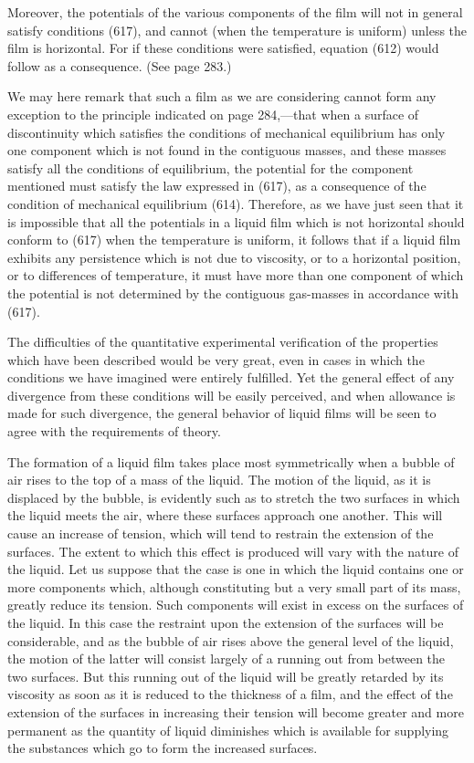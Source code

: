 \documentclass[12pt]{article}
\begin{document}
Moreover, the potentials of the various components of the film will not in general satisfy conditions (617), and cannot (when the temperature is uniform) unless the film is horizontal. For if these conditions were satisfied, equation (612) would follow as a consequence. (See page 283.)

We may here remark that such a film as we are considering cannot form any exception to the principle indicated on page 284,---that when a surface of discontinuity which satisfies the conditions of mechanical equilibrium has only one component which is not found in the contiguous masses, and these masses satisfy all the conditions of equilibrium, the potential for the component mentioned must satisfy the law expressed in (617), as a consequence of the condition of mechanical equilibrium (614). Therefore, as we have just seen that it is impossible that all the potentials in a liquid film which is not horizontal should conform to (617) when the temperature is uniform, it follows that if a liquid film exhibits any persistence which is not due to viscosity, or to a horizontal position, or to differences of temperature, it must have more than one component of which the potential is not determined by the contiguous gas-masses in accordance with (617).

The difficulties of the quantitative experimental verification of the properties which have been described would be very great, even in cases in which the conditions we have imagined were entirely fulfilled. Yet the general effect of any divergence from these conditions will be easily perceived, and when allowance is made for such divergence, the general behavior of liquid films will be seen to agree with the requirements of theory.

The formation of a liquid film takes place most symmetrically when a bubble of air rises to the top of a mass of the liquid. The motion of the liquid, as it is displaced by the bubble, is evidently such as to stretch the two surfaces in which the liquid meets the air, where these surfaces approach one another. This will cause an increase of tension, which will tend to restrain the extension of the surfaces. The extent to which this effect is produced will vary with the nature of the liquid. Let us suppose that the case is one in which the liquid contains one or more components which, although constituting but a very small part of its mass, greatly reduce its tension. Such components will exist in excess on the surfaces of the liquid. In this case the restraint upon the extension of the surfaces will be considerable, and as the bubble of air rises above the general level of the liquid, the motion of the latter will consist largely of a running out from between the two surfaces. But this running out of the liquid will be greatly retarded by its viscosity as soon as it is reduced to the thickness of a film, and the effect of the extension of the surfaces in increasing their tension will become greater and more permanent as the quantity of liquid diminishes which is available for supplying the substances which go to form the increased surfaces.
\end{document}
